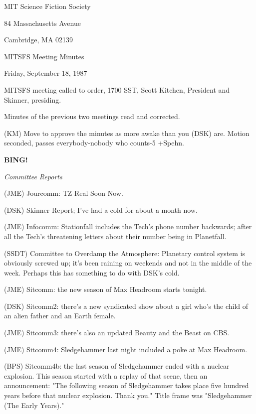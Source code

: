 \documentclass[12pt]{article}
\newcommand{\bing}{{\bf BING!} }
\newcommand{\goto}[1]{\bing \vskip 12pt \centerline{{\em{#1}}}}
\begin{document}
\begin{center}

MIT Science Fiction Society 

84 Massachusetts Avenue

Cambridge, MA 02139

\vspace{12pt}

MITSFS Meeting Minutes 

Friday, September 18, 1987

\end{center}
 
\vspace{18pt}

\setlength{\parskip}{6pt}

\noindent
MITSFS meeting called to order, 1700 SST,
Scott Kitchen, President and Skinner, presiding.

Minutes of the previous two meetings read and corrected.

(KM) Move to approve the minutes as more awake than you (DSK) are. Motion seconded, passes everybody-nobody who counts-5 +Spehn.

\goto{Committee Reports}

(JME) Jourcomm: TZ Real Soon Now.

(DSK) Skinner Report; I've had a cold for about a month now.

(JME) Infocomm: Stationfall includes the Tech's phone number backwards; after all the Tech's threatening letters about their number being in Planetfall.

(SSDT) Committee to Overdamp the Atmosphere: Planetary control system is obviously screwed up; it's been raining on weekends and not in the middle of the week. Perhaps this has something to do with DSK's cold.

(JME) Sitcomm: the new season of Max Headroom starts tonight.

(DSK) Sitcomm2: there's a new syndicated show about a girl who's the child of an alien father and an Earth female.

(JME) Sitcomm3: there's also an updated Beauty and the Beast on CBS.

(JME) Sitcomm4: Sledgehammer last night included a poke at Max Headroom.

(BPS) Sitcomm4b: the last season of Sledgehammer ended with a nuclear explosion. This season started with a replay of that scene, then an announcement: "The following season of Sledgehammer takes place five hundred years before that nuclear explosion. Thank you." Title frame was "Sledgehammer (The Early Years)."
\end{document}
